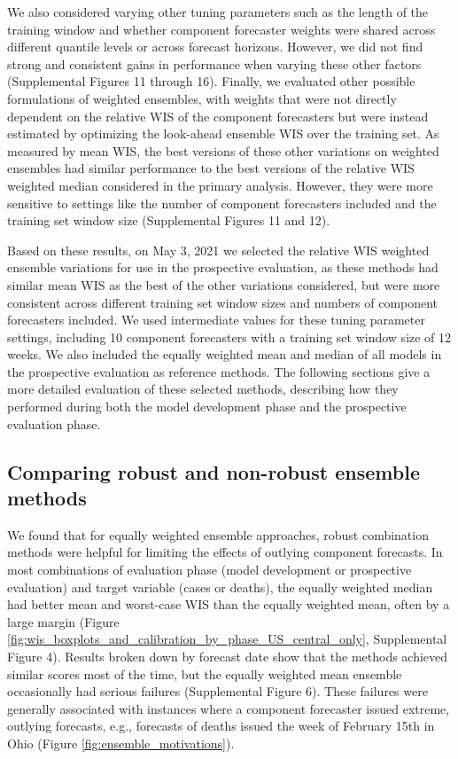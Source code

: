 \documentclass[11pt,3p,review,authoryear]{elsarticle}
\begin{document}
We also considered varying other tuning parameters such as the length of the training window and whether component forecaster weights were shared across different quantile levels or across forecast horizons. However, we did not find strong and consistent gains in performance when varying these other factors (Supplemental Figures 11 through 16). Finally, we evaluated other possible formulations of weighted ensembles, with weights that were not directly dependent on the relative WIS of the component forecasters but were instead estimated by optimizing the look-ahead ensemble WIS over the training set. As measured by mean WIS, the best versions of these other variations on weighted ensembles had similar performance to the best versions of the relative WIS weighted median considered in the primary analysis. However, they were more sensitive to settings like the number of component forecasters included and the training set window size (Supplemental Figures 11 and 12).

Based on these results, on May 3, 2021 we selected the relative WIS weighted ensemble variations for use in the prospective evaluation, as these methods had similar mean WIS as the best of the other variations considered, but were more consistent across different training set window sizes and numbers of component forecasters included. We used intermediate values for these tuning parameter settings, including 10 component forecasters with a training set window size of 12 weeks. We also included the equally weighted mean and median of all models in the prospective evaluation as reference methods. The following sections give a more detailed evaluation of these selected methods, describing how they performed during both the model development phase and the prospective evaluation phase.

\subsection{Comparing robust and non-robust ensemble methods}
\label{subsec:results_robust}

We found that for equally weighted ensemble approaches, robust combination methods were helpful for limiting the effects of outlying component forecasts. In most combinations of evaluation phase (model development or prospective evaluation) and target variable (cases or deaths), the equally weighted median had better mean and worst-case WIS than the equally weighted mean, often by a large margin (Figure \ref{fig:wis_boxplots_and_calibration_by_phase_US_central_only}, Supplemental Figure 4). Results broken down by forecast date show that the methods achieved similar scores most of the time, but the equally weighted mean ensemble occasionally had serious failures (Supplemental Figure 6). These failures were generally associated with instances where a component forecaster issued extreme, outlying forecasts, e.g., forecasts of deaths issued the week of February 15th in Ohio (Figure \ref{fig:ensemble_motivations}).
\end{document}
